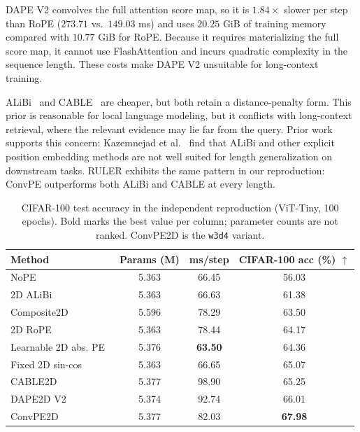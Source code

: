 \documentclass{article}
\begin{document}
DAPE V2 convolves the full attention score map, so it is $1.84\times$ slower per step than RoPE ($273.71$ vs.\ $149.03$ ms) and uses $20.25$ GiB of training memory compared with $10.77$ GiB for RoPE. Because it requires materializing the full score map, it cannot use FlashAttention and incurs quadratic complexity in the sequence length. These costs make DAPE V2 unsuitable for long-context training.

ALiBi~\cite{press2021train} and CABLE~\cite{veisi2025cable} are cheaper, but both retain a distance-penalty form. This prior is reasonable for local language modeling, but it conflicts with long-context retrieval, where the relevant evidence may lie far from the query. Prior work supports this concern: Kazemnejad et al.~\cite{kazemnejad2023impact} find that ALiBi and other explicit position embedding methods are not well suited for length generalization on downstream tasks. RULER exhibits the same pattern in our reproduction: ConvPE outperforms both ALiBi and CABLE at every length.

\begin{table}[!ht]
\centering
\small
\setlength{\tabcolsep}{4pt}
\begin{tabular}{lccc}
\toprule
Method & Params (M) & ms/step & CIFAR-100 acc (\%) $\uparrow$ \\
\midrule
NoPE~\cite{kazemnejad2023impact}             & 5.363 & 66.45 & 56.03 \\
2D ALiBi~\cite{fuller2023croma}       & 5.363 & 66.63 & 61.38 \\
Composite2D~\cite{chang2021convolutionsselfattentionreinterpretingrelative}         & 5.596 & 78.29 & 63.50 \\
2D RoPE~\cite{heo2024ropevit}       & 5.363 & 78.44 & 64.17 \\
Learnable 2D abs. PE~\cite{dosovitskiy2021image} & 5.376 & \textbf{63.50} & 64.36 \\
Fixed 2D sin-cos~\cite{dosovitskiy2021image}    & 5.363 & 66.65 & 65.07 \\
CABLE2D~\cite{veisi2025cable}           & 5.377 & 98.90 & 65.25 \\
DAPE2D V2~\cite{zheng2025dapev2}            & 5.374 & 92.74 & 66.01 \\
ConvPE2D           & 5.377 & 82.03 & \textbf{67.98} \\
\bottomrule
\end{tabular}
\caption{CIFAR-100 test accuracy in the independent reproduction (ViT-Tiny, 100 epochs). Bold marks the best value per column; parameter counts are not ranked. ConvPE2D is the \texttt{w3d4} variant.}
\label{tab:cifar100}
\end{table}
\end{document}
